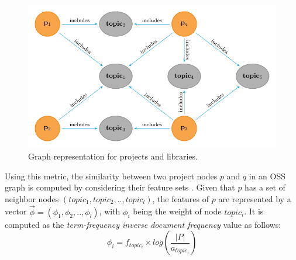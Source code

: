 \begin{figure}[t!]
	\centering
	\includegraphics[width=\columnwidth]{figs/Graph.pdf}
	\caption{Graph representation for projects and libraries.}
	\label{fig:Graph}
\end{figure}




Using this metric, the similarity between two project nodes $p$ and $q$ in an OSS graph is computed 
by considering their feature sets \cite{DiNoia:2012:LOD:2362499.2362501}. Given that $p$ has a 
set of neighbor nodes 
$(topic_{1},topic_{2},..,topic_{l})$, the features of $p$ are represented by a vector 
$\overrightarrow{\phi}=(\phi_{1},\phi_{2},..,\phi_{l})$, with $\phi_{i}$ being the weight of node 
$topic_{i}$. It is computed as the \emph{term-frequency inverse document frequency} value as follows: 
\begin{equation}\label{eqn:TFIDF}
\phi_{i} = f_{topic_{i}} \times log(\frac{ \left | P \right |}{a_{topic_{i}}})
\end{equation}

